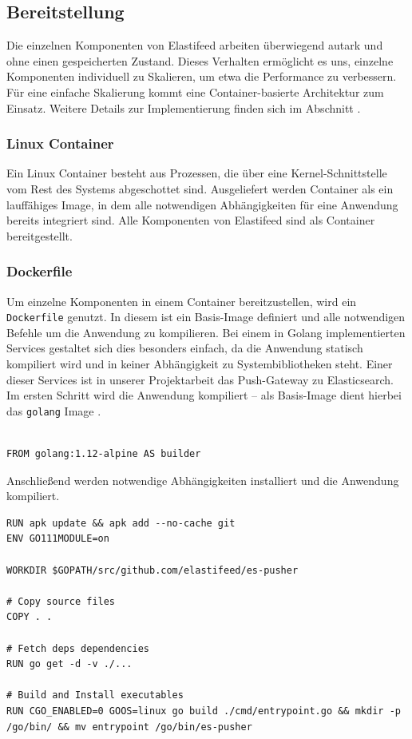 \subsection{Bereitstellung}
Die einzelnen Komponenten von Elastifeed arbeiten überwiegend autark und ohne einen gespeicherten Zustand.
Dieses Verhalten ermöglicht es uns, einzelne Komponenten individuell zu Skalieren, um etwa die Performance zu verbessern.
Für eine einfache Skalierung kommt eine Container-basierte Architektur zum Einsatz.
Weitere Details zur Implementierung finden sich im Abschnitt .

\subsubsection{Linux Container}
Ein Linux Container besteht aus Prozessen, die über eine Kernel-Schnittstelle vom Rest des Systems abgeschottet sind. Ausgeliefert werden Container als ein lauffähiges Image, in dem alle notwendigen Abhängigkeiten für eine Anwendung bereits integriert sind.
Alle Komponenten von Elastifeed sind als Container bereitgestellt.

\subsubsection{Dockerfile}
Um einzelne Komponenten in einem Container bereitzustellen, wird ein \texttt{Dockerfile} genutzt.
In diesem ist ein Basis-Image definiert und alle notwendigen Befehle um die Anwendung zu kompilieren.
Bei einem in Golang implementierten Services gestaltet sich dies besonders einfach, da die Anwendung statisch kompiliert wird und in keiner Abhängigkeit zu Systembibliotheken steht.
Einer dieser Services ist in unserer Projektarbeit das Push-Gateway zu Elasticsearch.
Im ersten Schritt wird die Anwendung kompiliert  – als Basis-Image dient hierbei das \texttt{golang} Image \cite{god}.

\begin{verbatim}

FROM golang:1.12-alpine AS builder

\end{verbatim}

Anschließend werden notwendige Abhängigkeiten installiert und die Anwendung kompiliert.

\begin{verbatim}
RUN apk update && apk add --no-cache git
ENV GO111MODULE=on

WORKDIR $GOPATH/src/github.com/elastifeed/es-pusher

# Copy source files
COPY . .

# Fetch deps dependencies
RUN go get -d -v ./...

# Build and Install executables
RUN CGO_ENABLED=0 GOOS=linux go build ./cmd/entrypoint.go && mkdir -p /go/bin/ && mv entrypoint /go/bin/es-pusher
\end{verbatim}

